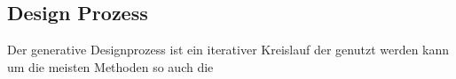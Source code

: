 \subsection*{Design Prozess}

Der generative Designprozess ist ein iterativer Kreislauf der genutzt werden kann um die meisten Methoden so auch die \autocite{12}